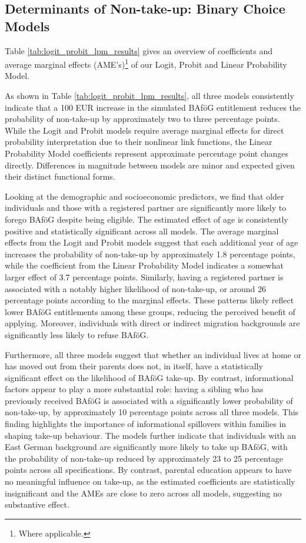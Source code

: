 \subsection{Determinants of Non-take-up: Binary Choice Models}
Table \ref{tab:logit_probit_lpm_results} gives an overview of coefficients and average marginal effects (AME's)\footnote{Where applicable.} of our Logit, Probit and Linear Probability Model.


As shown in Table \ref{tab:logit_probit_lpm_results}, all three models consistently indicate that a 100 EUR increase in the simulated BAföG entitlement reduces the probability of non-take-up by approximately two to three percentage points. 
While the Logit and Probit models require average marginal effects for direct probability interpretation due to their nonlinear link functions, the Linear Probability Model coefficients represent approximate percentage point changes directly. 
Differences in magnitude between models are minor and expected given their distinct functional forms.



Looking at the demographic and socioeconomic predictors, we find that older individuals and those with a registered partner are significantly more likely to forego BAföG despite being eligible. 
The estimated effect of age is consistently positive and statistically significant across all models. 
The average marginal effects from the Logit and Probit models suggest that each additional year of age increases the probability of non-take-up by approximately 1.8 percentage points, while the coefficient from the Linear Probability Model indicates a somewhat larger effect of 3.7 percentage points. 
Similarly, having a registered partner is associated with a notably higher likelihood of non-take-up, or around 26 percentage points according to the marginal effects. 
These patterns likely reflect lower BAföG entitlements among these groups, reducing the perceived benefit of applying. Moreover, individuals with direct or indirect migration backgrounds are significantly less likely to refuse BAföG.

Furthermore, all three models suggest that whether an individual lives at home or has moved out from their parents does not, in itself, have a statistically significant effect on the likelihood of BAföG take-up. 
By contrast, informational factors appear to play a more substantial role: having a sibling who has previously received BAföG is associated with a significantly lower probability of non-take-up, by approximately 10 percentage points across all three models. 
This finding highlights the importance of informational spillovers within families in shaping take-up behaviour. 
The models further indicate that individuals with an East German background are significantly more likely to take up BAföG, with the probability of non-take-up reduced by approximately 23 to 25 percentage points across all specifications. 
By contrast, parental education appears to have no meaningful influence on take-up, as the estimated coefficients are statistically insignificant and the AMEs are close to zero across all models, suggesting no substantive effect.

